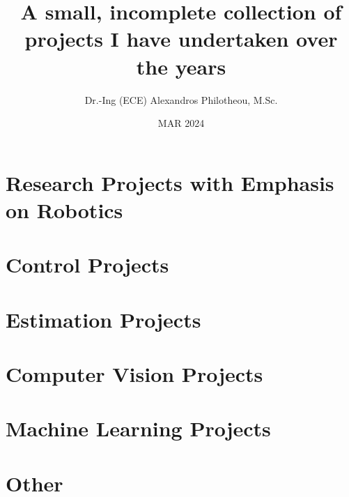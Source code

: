 






  \title{\Huge A small, incomplete collection of projects I have undertaken over the years}
  \author{Dr.-Ing (ECE) Alexandros Philotheou, M.Sc. }
  \date{MAR 2024}
  \maketitle
  \vspace{2cm}

  \tableofcontents
  \thispagestyle{empty}
  \clearpage

  \section{Research Projects with Emphasis on Robotics}
    
    \newpage
    
    \newpage

  \section{Control Projects}
    
    \newpage
    
    \newpage
    
    \newpage
    
    \newpage

  \section{Estimation Projects}
    
    \newpage

  \section{Computer Vision Projects}
    
    \newpage

  \section{Machine Learning Projects}
    
    \newpage

  \section{Other}
    

  \printbibliography[notcategory=nobibliography]


